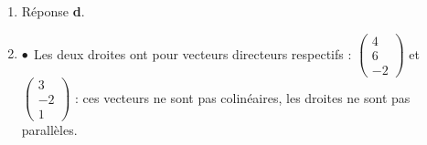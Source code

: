 \begin{enumerate}
$\left\{\begin{array}{l c l}x - 1&=&3t\\y - 0&=&1t\\z - 3&=&- 3t, \end{array}\right. \: t \in \R\iff \left\{\begin{array}{l c l}
x &=& 1 + 3t\\
y &=&\phantom{1 + 3}t\\
z&=&3 - 3t
\end{array}\right.\: t \in \R$ Réponse \textbf{c.~}

On considère la droite $(d)$ de représentation paramétrique 

$\left\{\begin{array}{l c l}
x&=&3 + 4t\\
y&=&\phantom{3 + }6t\\
z&=&4 - 2 t
\end{array}\right.$ avec $t \in \R$

\item %
Réponse \textbf{d}.
\item %

%
%
$\bullet~~$Les deux droites ont pour vecteurs directeurs respectifs : $\begin{pmatrix}4\\6\\-2\end{pmatrix}$ et $\begin{pmatrix}3\\-2\\1\end{pmatrix}$ : ces vecteurs ne sont pas colinéaires, les droites ne sont pas parallèles.


\end{enumerate}
